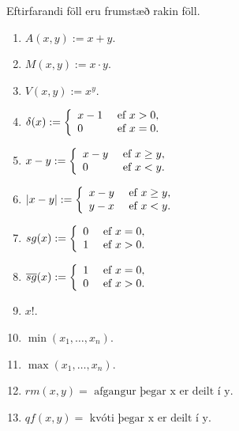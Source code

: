 \documentclass[12pt]{book}
\newcommand{\xxn}{x_1, \dotsc, x_n}
\begin{document}
\begin{setn}[og skilgreining]
  Eftirfarandi föll eru frumstæð rakin föll.
  \begin{enumerate}[(1)]
  \item $A(x,y) := x+y$.
  \item $M(x,y) := x \cdot y$.
  \item $V(x,y) := x ^ y$.
  \item $ \delta (x) := \left\{ \begin{array}{l l} x-1 & \text{ ef } x > 0, \\ 0 & \text{ ef } x = 0. \end{array} \right.$
  \item $ x-y := \left\{ \begin{array}{l l} x-y & \text{ ef } x \geq y, \\ 0 & \text{ ef } x < y. \end{array} \right.$
  \item $ |x-y| := \left\{ \begin{array}{l l} x-y & \text{ ef } x \geq y, \\ y - x & \text{ ef } x < y. \end{array} \right.$
  \item $ sg(x) := \left\{ \begin{array}{l l} 0 & \text{ ef } x = 0 , \\ 1 & \text{ ef } x > 0. \end{array} \right.$
  \item $ \overline{sg}(x) := \left\{ \begin{array}{l l} 1 & \text{ ef } x = 0 , \\ 0 &  \text{ ef } x > 0. \end{array} \right.$
  \item $x!$.
  \item $\min(\xxn)$.
  \item $\max(\xxn)$.
  \item $rm(x,y) = \text{ afgangur þegar x er deilt í y}$.
  \item $qf(x,y) = \text{ kvóti þegar x er deilt í y}$.
  \end{enumerate}
\end{setn}
\end{document}
